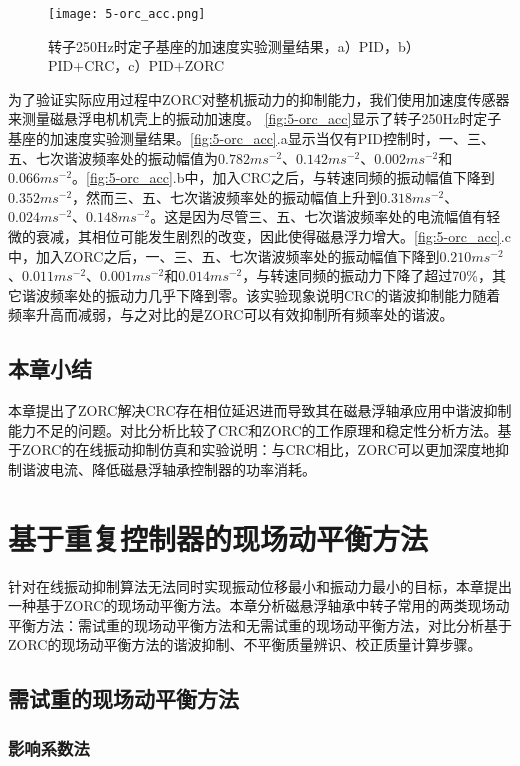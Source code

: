 \documentclass[
  lang=cn,
  degree=master,
  openany,oneside
]{nuaathesis}
\begin{document}
\begin{figure}[h!]
	\texttt{[image: 5-orc\_acc.png]}
	\caption{转子250Hz时定子基座的加速度实验测量结果，a）PID，b）PID+CRC，c）PID+ZORC}
	\label{fig:5-orc_acc}
\end{figure}

为了验证实际应用过程中ZORC对整机振动力的抑制能力，我们使用加速度传感器来测量磁悬浮电机机壳上的振动加速度。
\autoref{fig:5-orc_acc}显示了转子250Hz时定子基座的加速度实验测量结果。\autoref{fig:5-orc_acc}.a显示当仅有PID控制时，一、三、五、七次谐波频率处的振动幅值为$0.782ms^{-2}$、$0.142ms^{-2}$、$0.002ms^{-2}$和$0.066ms^{-2}$。\autoref{fig:5-orc_acc}.b中，加入CRC之后，与转速同频的振动幅值下降到$0.352ms^{-2}$，然而三、五、七次谐波频率处的振动幅值上升到$0.318ms^{-2}$、$0.024ms^{-2}$、$0.148ms^{-2}$。这是因为尽管三、五、七次谐波频率处的电流幅值有轻微的衰减，其相位可能发生剧烈的改变，因此使得磁悬浮力增大。\autoref{fig:5-orc_acc}.c中，加入ZORC之后，一、三、五、七次谐波频率处的振动幅值下降到$0.210ms^{-2}$、$0.011ms^{-2}$、$0.001ms^{-2}$和$0.014ms^{-2}$，与转速同频的振动力下降了超过70\%，其它谐波频率处的振动力几乎下降到零。该实验现象说明CRC的谐波抑制能力随着频率升高而减弱，与之对比的是ZORC可以有效抑制所有频率处的谐波。
\section{本章小结}
本章提出了ZORC解决CRC存在相位延迟进而导致其在磁悬浮轴承应用中谐波抑制能力不足的问题。对比分析比较了CRC和ZORC的工作原理和稳定性分析方法。基于ZORC的在线振动抑制仿真和实验说明：与CRC相比，ZORC可以更加深度地抑制谐波电流、降低磁悬浮轴承控制器的功率消耗。

\chapter{基于重复控制器的现场动平衡方法}
针对在线振动抑制算法无法同时实现振动位移最小和振动力最小的目标，本章提出一种基于ZORC的现场动平衡方法。本章分析磁悬浮轴承中转子常用的两类现场动平衡方法：需试重的现场动平衡方法和无需试重的现场动平衡方法，对比分析基于ZORC的现场动平衡方法的谐波抑制、不平衡质量辨识、校正质量计算步骤。

\section{需试重的现场动平衡方法}

\subsection{影响系数法}
\end{document}
